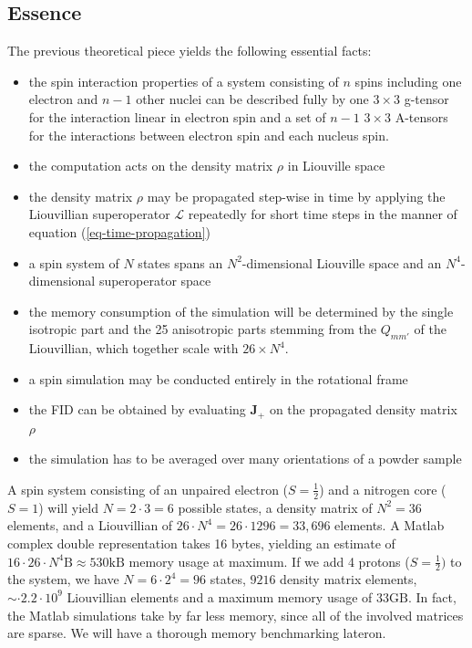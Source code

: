 \documentclass[11.5pt,a4paper]{article}
\begin{document}
\subsection{Essence}
The previous theoretical piece yields the following essential facts:
\begin{itemize}
  \item the spin interaction properties of a system consisting of $n$ spins including one electron and $n-1$ other nuclei can be described fully by one $3 \times 3$ g-tensor for the interaction linear in electron spin and a set of $n-1$ $3 \times 3$ A-tensors for the interactions between electron spin and each nucleus spin.
  \item the computation acts on the density matrix $\rho$ in Liouville space
  \item the density matrix $\rho$ may be propagated step-wise in time by applying the Liouvillian superoperator $\mathcal{L}$ repeatedly for short time steps in the manner of equation (\ref{eq-time-propagation})
  \item a spin system of $N$ states spans an $N^2$-dimensional Liouville space and an $N^4$-dimensional superoperator space
  \item the memory consumption of the simulation will be determined by the single isotropic part and the 25 anisotropic parts stemming from the $Q_{mm'}$ of the Liouvillian, which together scale with $26 \times N^4$.
  \item a spin simulation may be conducted entirely in the rotational frame
  \item the FID can be obtained by evaluating $\mathbf{J_+}$ on the propagated density matrix $\rho$
  \item the simulation has to be averaged over many orientations of a powder sample
\end{itemize}
A spin system consisting of an unpaired electron ($S=\tfrac{1}{2}$) and a nitrogen core ($S=1$) will yield $N = 2 \cdot 3 = 6$ possible states, a density matrix of $N^2 = 36$ elements, and a Liouvillian of $26 \cdot N^4=26 \cdot 1296 = 33,696$ elements. A Matlab complex double representation takes 16 bytes, yielding an estimate of $16 \cdot 26 \cdot N^4 \text{B} \approx 530 \text{kB}$ memory usage at maximum. If we add 4 protons ($S=\tfrac{1}{2})$ to the system, we have $N = 6 \cdot 2^4= 96$ states, $9216$ density matrix elements, $\sim \cdot 2.2 \cdot 10^{9}$ Liouvillian elements and a maximum memory usage of $33 \text{GB}$. In fact, the Matlab simulations take by far less memory, since all of the involved matrices are sparse. We will have a thorough memory benchmarking lateron.
\end{document}
